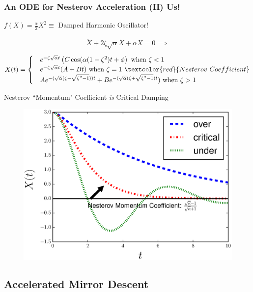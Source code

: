\documentclass{beamer}
\begin{document}
\begin{frame}
\frametitle{An ODE for Nesterov Acceleration (II) Us!}
\begin{block}{$f(X) = \frac{\alpha}{2} X^2 \equiv$ Damped Harmonic Oscillator!}
\begin{center}
\vspace{-,25cm}
\begin{align*}
   \ddot{X} + 2 \zeta \sqrt{\alpha} \dot{X} + \alpha X = 0 \implies 
\end{align*}
\vspace{-1cm}
\begin{align*}
   X(t) = \begin{cases}
   & e^{-\zeta \sqrt{\alpha} t} \left( C \cos(\alpha(1-\zeta^2) t+\phi \right) \text{ when } \zeta < 1 \\
   & e^{-\zeta \sqrt{\alpha} t}(A+B t) \text{ when } \zeta = 1 \ \textcolor{red}{ Nesterov \ Coefficient } \\
   & A e^{ -(\sqrt{\alpha}(\zeta - \sqrt{\zeta^2-1})) t}+ B e^{ -(\sqrt{\alpha}(\zeta + \sqrt{\zeta^2-1}) t})   \text{ when } \zeta > 1
   \end{cases}
\end{align*}
\end{center}
\end{block}

\begin{block}{Nesterov ``Momentum" Coefficient \textit{is} Critical Damping }
\begin{figure}
\includegraphics[width=0.4\linewidth]{Experiments/critical_damp_Nesterov.eps}
\caption{}
\end{figure}

\end{block}

\end{frame}



\subsection{Accelerated Mirror Descent}
\end{document}
